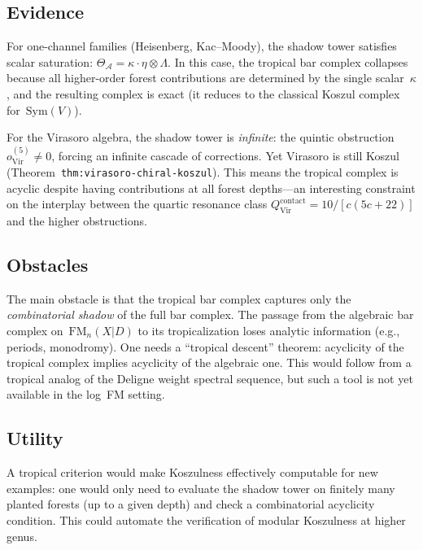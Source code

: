 \documentclass[11pt]{article}
\newcommand{\cA}{\mathcal{A}}
\newcommand{\FM}{\mathrm{FM}}
\newcommand{\Sym}{\mathrm{Sym}}
\theoremstyle{plain}
\theoremstyle{definition}
\theoremstyle{remark}
\begin{document}
\subsection{Evidence}

For one-channel families (Heisenberg, Kac--Moody), the shadow
tower satisfies scalar saturation:
$\Theta_\cA = \kappa \cdot \eta \otimes \Lambda$.  In this case,
the tropical bar complex collapses because all higher-order forest
contributions are determined by the single scalar~$\kappa$, and
the resulting complex is exact (it reduces to the classical Koszul
complex for~$\Sym(V)$).

For the Virasoro algebra, the shadow tower is \emph{infinite}:
the quintic obstruction $o^{(5)}_{\mathrm{Vir}} \neq 0$, forcing
an infinite cascade of corrections.  Yet Virasoro is still Koszul
(Theorem~\texttt{thm:virasoro-chiral-koszul}).  This means the
tropical complex is acyclic despite having contributions at all
forest depths---an interesting constraint on the interplay between
the quartic resonance class $Q^{\mathrm{contact}}_{\mathrm{Vir}}
= 10/[c(5c+22)]$ and the higher obstructions.

\subsection{Obstacles}

The main obstacle is that the tropical bar complex captures only
the \emph{combinatorial shadow} of the full bar complex.  The
passage from the algebraic bar complex on~$\FM_n(X|D)$ to its
tropicalization loses analytic information (e.g., periods,
monodromy).  One needs a ``tropical descent'' theorem: acyclicity
of the tropical complex implies acyclicity of the algebraic one.
This would follow from a tropical analog of the Deligne weight
spectral sequence, but such a tool is not yet available in the
log~FM setting.

\subsection{Utility}

A tropical criterion would make Koszulness effectively computable
for new examples: one would only need to evaluate the shadow tower
on finitely many planted forests (up to a given depth) and check
a combinatorial acyclicity condition.  This could automate the
verification of modular Koszulness at higher genus.


\end{document}
